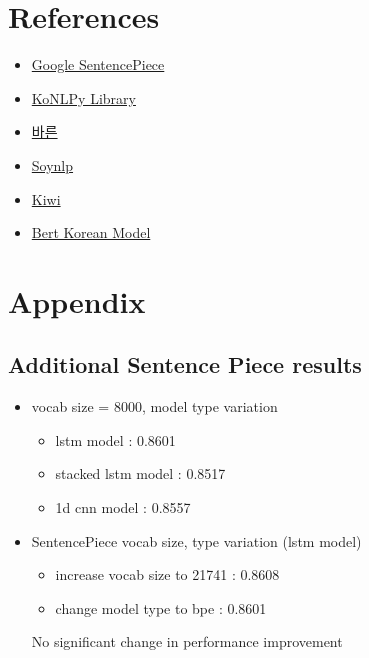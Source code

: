 \documentclass{article}
\begin{document}
\section{References}

\begin{itemize}
    \item \href{https://github.com/google/sentencepiece}{Google SentencePiece}
    \item \href{https://konlpy.org/}{KoNLPy Library}
    \item \href{https://bareun.ai/}{바른}
    \item \href{https://github.com/lovit/soynlp}{Soynlp}
    \item \href{https://github.com/bab2min/Kiwi}{Kiwi}
    \item \href{https://aiopen.etri.re.kr/bertModel}{Bert Korean Model}
\end{itemize}

\section{Appendix}

\subsection{Additional Sentence Piece results}

\begin{itemize}
\item vocab size = 8000, model type variation
    \begin{itemize}
        \item lstm model : 0.8601
        \item stacked lstm model : 0.8517
        \item 1d cnn model : 0.8557
    \end{itemize}

\item SentencePiece vocab size, type variation (lstm model)
    \begin{itemize}
        \item increase vocab size to 21741 : 0.8608
        \item change model type to bpe : 0.8601
    \end{itemize}
No significant change in performance improvement

\end{itemize}
\end{document}
